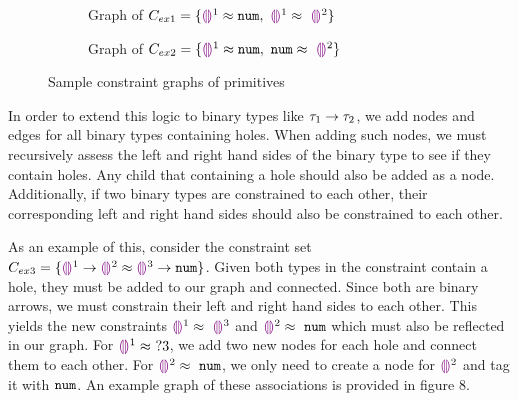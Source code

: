 \begin{figure}[htbp]
\centering
\begin{subfigure}{.49\textwidth}
  \centering
  \caption{Graph of $C_{ex1} = \{ \tehole^{1} \approx \tnum, ~ \tehole^{1} \approx~ \tehole^{2}\}$}
  \label{fig:sub1}
\end{subfigure}
\begin{subfigure}{.49\textwidth}
  \centering
  \caption{Graph of $C_{ex2} = \{ \tehole^{1} \approx \tnum, ~ \tnum \approx~ \tehole^{2}\}$}
  \label{fig:sub2}
\end{subfigure}
\caption{Sample constraint graphs of primitives}
\label{fig:test}
\end{figure}

In order to extend this logic to binary types like $\tarr{\tau_1}{\tau_2}$, we add nodes and edges for all binary types containing holes. When adding such nodes, we must recursively assess the left and right hand sides of the binary type to see if they contain holes. Any child that containing a hole should also be added as a node. Additionally, if two binary types are constrained to each other, their corresponding left and right hand sides should also be constrained to each other.

As an example of this, consider the constraint set $C_{ex3} = \{ \tarr{\tehole^{1}}{\tehole^{2}} \approx \tarr{\tehole^{3}}{\tnum}  \}$.
Given both types in the constraint contain a hole, they must be added to our graph and connected. Since both are binary arrows, we must constrain their left and right hand sides to each other. This yields the new constraints $\tehole^{1} \approx~ \tehole^{3}$ and $\tehole^{2} \approx~ \tnum$ which must also be reflected in our graph. For $\tehole^{1} \approx~ ?3$, we add two new nodes for each hole and connect them to each other. For $\tehole^{2} \approx~ \tnum$, we only need to create a node for $\tehole^{2}$ and tag it with $\tnum$. An example graph of these associations is provided in figure 8.

